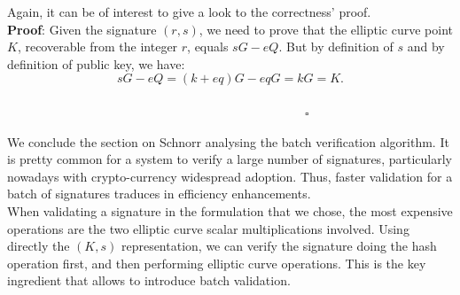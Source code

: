 \bigskip
\noindent
Again, it can be of interest to give a look to the correctness' proof.
\\
{\bf Proof}: Given the signature $(r, s)$, we need to prove that the elliptic curve point $K$, recoverable from the integer $r$, equals $sG - eQ$. But by definition of $s$ and by definition of public key, we have:
$$sG - eQ = (k + eq)G - eqG = kG = K.$$ 
\ \ \ \ \ \ \ \ \ \ \ \ \ \ \ \ \ \ \ \ \ \ \ \ \ \ \ \ \ \ \ \ \ \ \ \ \ \ \ \ \ \ \ \ \ \ \ \ \ \ \ \ \ \ \ \ \ \ \ \ \ \ \ \ \ \ \ \ \ \ \ \ \ \ \ \ \ \ \ \ \ \ \ \ \ \ \ \ \ \ \ \ \ \ \ \ \ \ \ \ \ \ \ \ \ \ \ \ \ \ \ \ \ \ \ \ \ \ \ \ $\square$

\bigskip
\noindent
We conclude the section on Schnorr analysing the batch verification algorithm. It is pretty common for a system to verify a large number of signatures, particularly nowadays with crypto-currency widespread adoption. Thus, faster validation for a batch of signatures traduces in efficiency enhancements.
\\
When validating a signature in the formulation that we chose, the most expensive operations are the two elliptic curve scalar multiplications involved. Using directly the $(K, s)$ representation, we can verify the signature doing the hash operation first, and then performing elliptic curve operations. This is the key ingredient that allows to introduce batch validation.

